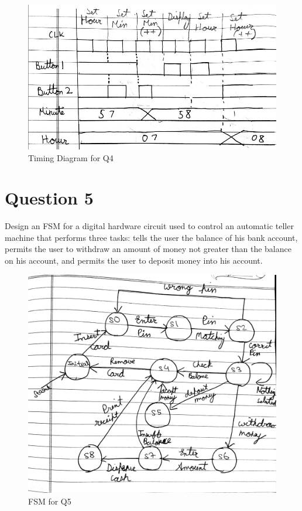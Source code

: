 \documentclass[11pt,a4paper]{article}
\begin{document}
	\begin{figure}[H]
		\centering
		\includegraphics[width=1\linewidth]{images/q4timing}
		\caption[]{Timing Diagram for Q4}
		\label{fig:q4timing}
	\end{figure}
	\section*{Question 5}
	Design an FSM for a digital hardware circuit used to control an automatic teller machine that performs three tasks: tells the user the balance of his bank account, permits the user to withdraw an amount of money not greater than the balance on his account, and permits the user to deposit money into his account.
	
	\begin{figure}[H]
		\centering
		\includegraphics[scale=0.12]{images/q5fsm}
		\caption[]{FSM for Q5}
		\label{fig:q5fsm}
	\end{figure}
\end{document}
